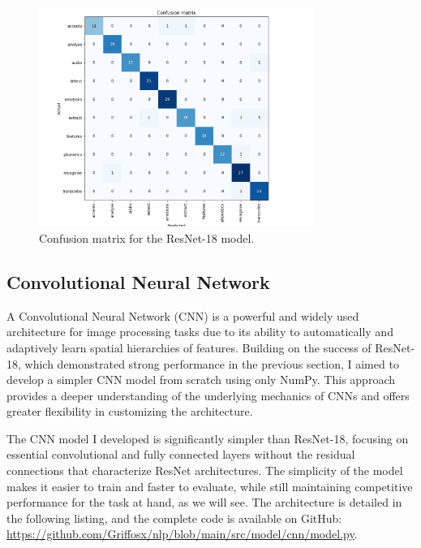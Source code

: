 \documentclass[12pt]{article}
\begin{document}
\begin{figure}[h]
\centering
\includegraphics[width=0.8\textwidth]{confusion_matrix_resnet.png}
\caption{Confusion matrix for the ResNet-18 model.}
\label{fig:confusion_matrix_resnet}
\end{figure}


\subsection{Convolutional Neural Network}

A Convolutional Neural Network (CNN) is a powerful and widely used architecture for image processing tasks due to its ability to automatically and adaptively learn spatial hierarchies of features. Building on the success of ResNet-18, which demonstrated strong performance in the previous section, I aimed to develop a simpler CNN model from scratch using only NumPy. This approach provides a deeper understanding of the underlying mechanics of CNNs and offers greater flexibility in customizing the architecture.

The CNN model I developed is significantly simpler than ResNet-18, focusing on essential convolutional and fully connected layers without the residual connections that characterize ResNet architectures. The simplicity of the model makes it easier to train and faster to evaluate, while still maintaining competitive performance for the task at hand, as we will see. The architecture is detailed in the following listing, and the complete code is available on GitHub: \href{https://github.com/Griffosx/nlp/blob/main/src/model/cnn/model.py}{https://github.com/Griffosx/nlp/blob/main/src/model/cnn/model.py}.
\end{document}
